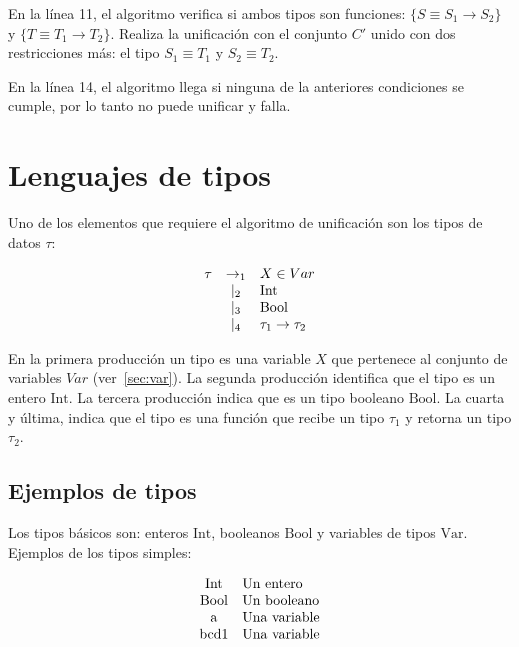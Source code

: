 \documentclass{article}
\begin{document}
En la línea 11, el algoritmo verifica si ambos tipos son funciones:
$\{S \equiv S_1 \to S_2\}$ y $\{T \equiv T_1 \to T_2\}$. Realiza la
unificación con el conjunto $C'$ unido con dos restricciones más: el
tipo $S_1 \equiv T_1$ y $S_2 \equiv T_2$.

En la línea 14, el algoritmo llega si ninguna de la anteriores
condiciones se cumple, por lo tanto no puede unificar y falla.

\section{Lenguajes de tipos}\label{sec:lenguajetipos}

Uno de los elementos que requiere el algoritmo de unificación
son los tipos de datos $\tau$:

\[
  \begin{array}[h]{rcl}
    \tau & \to_1  & X \in Var \\
         & \mid_2 & \text{Int} \\
         & \mid_3 & \text{Bool} \\
         & \mid_4 & \tau_1 \to \tau_2 \\
  \end{array}
\]

En la primera producción un tipo es una variable $X$ que pertenece al
conjunto de variables $Var$ (ver~\ref{sec:var}). La segunda producción
identifica que el tipo es un entero $\text{Int}$. La tercera
producción indica que es un tipo booleano $\text{Bool}$. La cuarta y
última, indica que el tipo es una función que recibe un tipo $\tau_1$ y
retorna un tipo $\tau_2$.

\subsection{Ejemplos de tipos}
\label{sec:ejemtipos}

Los tipos básicos son: enteros $\text{Int}$, booleanos $\text{Bool}$ y
variables de tipos $\text{Var}$. Ejemplos de los tipos simples:

\[
  \begin{array}[h]{cl}
    \text{Int} & \text{Un entero} \\
    \text{Bool} & \text{Un booleano} \\
    \text{a} & \text{Una variable} \\
    \text{bcd1} & \text{Una variable} \\
  \end{array}
\]
\end{document}

